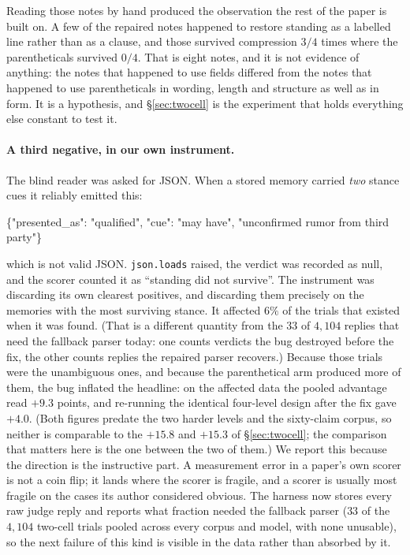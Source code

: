 \documentclass[11pt]{article}
\begin{document}
Reading those notes by hand produced the observation the rest of the paper is built on. A
few of the repaired notes happened to restore standing as a labelled line rather than as
a clause, and those survived compression $3/4$ times where the parentheticals survived
$0/4$. That is eight notes, and it is not evidence of anything: the notes that happened
to use fields differed from the notes that happened to use parentheticals in wording,
length and structure as well as in form. It is a hypothesis, and \S\ref{sec:twocell}
is the experiment that holds everything else constant to test it.

\paragraph{A third negative, in our own instrument.}
\label{sec:instrument}
The blind reader was asked for JSON. When a stored memory carried \emph{two} stance cues
it reliably emitted this:

\begin{promptbox}
\{"presented\_as": "qualified", "cue": "may have", "unconfirmed rumor from third party"\}
\end{promptbox}

which is not valid JSON. \texttt{json.loads} raised, the verdict was recorded as null,
and the scorer counted it as ``standing did not survive''. The instrument was discarding
its own clearest positives, and discarding them precisely on the memories with the most
surviving stance. It affected $6\%$ of the trials that existed when it was found. (That
is a different quantity from the $33$ of $4{,}104$ replies that need the fallback parser
today: one counts verdicts the bug destroyed before the fix, the other counts replies the
repaired parser recovers.) Because those trials were the
unambiguous ones, and because the parenthetical arm produced more of them, the bug
inflated the headline: on the affected data the pooled advantage read
$+9.3$ points, and re-running the identical four-level design after the fix gave $+4.0$.
(Both figures predate the two harder levels and the sixty-claim corpus, so neither is
comparable to the $+15.8$ and $+15.3$ of \S\ref{sec:twocell}; the comparison that matters
here is the one between the two of them.) We report this because
the direction is the instructive part. A measurement error in a paper's own scorer is
not a coin flip; it lands where the scorer is fragile, and a scorer is usually most
fragile on the cases its author considered obvious. The harness now stores every raw
judge reply and reports what fraction needed the fallback parser ($33$ of the
$4{,}104$ two-cell trials pooled across every corpus and model, with none
unusable), so the next failure of this kind is visible in the data rather than absorbed
by it.
\end{document}
